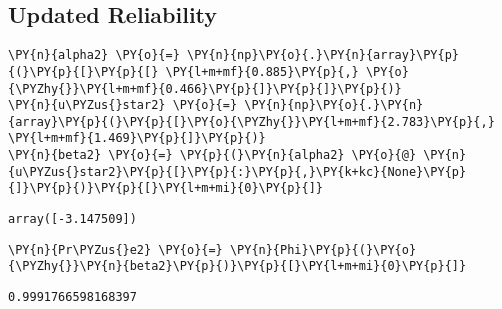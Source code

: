     \hypertarget{updated-reliability}{%
\subsection{Updated Reliability}\label{updated-reliability}}

    \begin{tcolorbox}[breakable, size=fbox, boxrule=1pt, pad at break*=1mm,colback=cellbackground, colframe=cellborder]
\begin{Verbatim}[commandchars=\\\{\}]
\PY{n}{alpha2} \PY{o}{=} \PY{n}{np}\PY{o}{.}\PY{n}{array}\PY{p}{(}\PY{p}{[}\PY{p}{[} \PY{l+m+mf}{0.885}\PY{p}{,} \PY{o}{\PYZhy{}}\PY{l+m+mf}{0.466}\PY{p}{]}\PY{p}{]}\PY{p}{)}
\PY{n}{u\PYZus{}star2} \PY{o}{=} \PY{n}{np}\PY{o}{.}\PY{n}{array}\PY{p}{(}\PY{p}{[}\PY{o}{\PYZhy{}}\PY{l+m+mf}{2.783}\PY{p}{,} \PY{l+m+mf}{1.469}\PY{p}{]}\PY{p}{)}
\PY{n}{beta2} \PY{o}{=} \PY{p}{(}\PY{n}{alpha2} \PY{o}{@} \PY{n}{u\PYZus{}star2}\PY{p}{[}\PY{p}{:}\PY{p}{,}\PY{k+kc}{None}\PY{p}{]}\PY{p}{)}\PY{p}{[}\PY{l+m+mi}{0}\PY{p}{]}
\end{Verbatim}
\end{tcolorbox}

            \begin{tcolorbox}[breakable, size=fbox, boxrule=.5pt, pad at break*=1mm, opacityfill=0]
\begin{Verbatim}[commandchars=\\\{\}]
array([-3.147509])
\end{Verbatim}
\end{tcolorbox}
        
    \begin{tcolorbox}[breakable, size=fbox, boxrule=1pt, pad at break*=1mm,colback=cellbackground, colframe=cellborder]
\begin{Verbatim}[commandchars=\\\{\}]
\PY{n}{Pr\PYZus{}e2} \PY{o}{=} \PY{n}{Phi}\PY{p}{(}\PY{o}{\PYZhy{}}\PY{n}{beta2}\PY{p}{)}\PY{p}{[}\PY{l+m+mi}{0}\PY{p}{]}
\end{Verbatim}
\end{tcolorbox}

            \begin{tcolorbox}[breakable, size=fbox, boxrule=.5pt, pad at break*=1mm, opacityfill=0]
\begin{Verbatim}[commandchars=\\\{\}]
0.9991766598168397
\end{Verbatim}
\end{tcolorbox}
        
